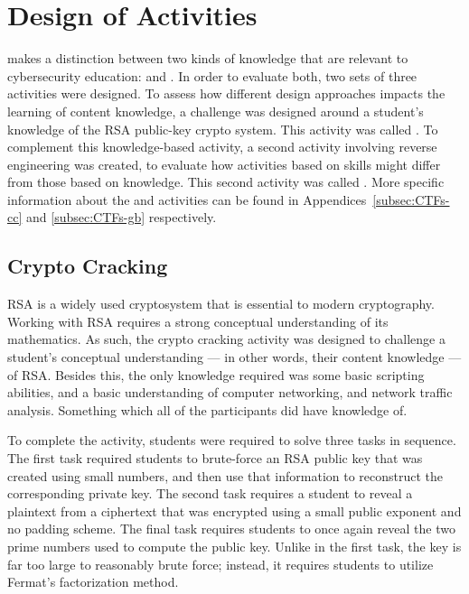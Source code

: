 


\providecommand{\heading}[1]{\section{#1}}
\providecommand{\subheading}[1]{\subsection{#1}}

\heading{Design of Activities}
    \textcite{R-Weiss} makes a distinction between two kinds of knowledge that are relevant to cybersecurity education:  and . %
In order to evaluate both, two sets of three activities were designed. %
To assess how different design approaches impacts the learning of content knowledge, a challenge was designed around a student's  knowledge of the RSA public-key crypto system. %
This activity was called . %
To complement this knowledge-based activity, a second activity involving reverse engineering was created, to evaluate how activities based on skills might differ from those based on knowledge. %
This second activity was called . %
More specific information about the  and  activities can be found in Appendices~\ref{subsec:CTFs-cc} and \ref{subsec:CTFs-gb} respectively.

\subheading{Crypto Cracking}
    RSA is a widely used cryptosystem that is essential to modern cryptography. %
Working with RSA requires a strong conceptual understanding of its mathematics. %
As such, the crypto cracking activity was designed to challenge a student's conceptual understanding ---%
 in other words, their content knowledge ---%
 of RSA. Besides this, the only knowledge required was some basic scripting abilities, and a basic understanding of computer networking, and network traffic analysis. %
Something which all of the participants did have knowledge of. 

        
    To complete the activity, students were required to solve three tasks in sequence. %
The first task required students to brute-force an RSA public key that was created using small numbers, and then use that information to reconstruct the corresponding private key. %
The second task requires a student to reveal a plaintext from a ciphertext that was encrypted using a small public exponent and no padding scheme. %
The final task requires students to once again reveal the two prime numbers used to compute the public key. %
Unlike in the first task, the key is far too large to reasonably brute force; %
instead, it requires students to utilize Fermat's factorization method. 

